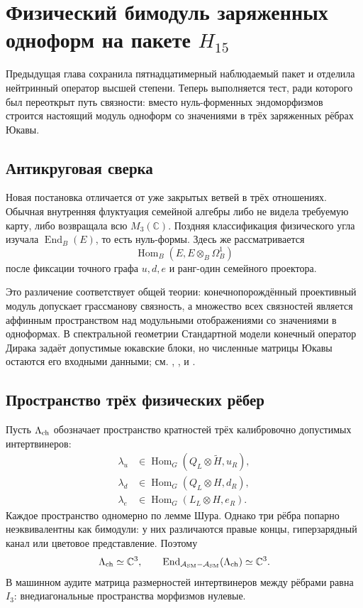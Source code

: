 \chapter{Физический бимодуль заряженных одноформ на пакете \texorpdfstring{$H_{15}$}{H15}}

Предыдущая глава сохранила пятнадцатимерный наблюдаемый пакет и отделила
нейтринный оператор высшей степени. Теперь выполняется тест, ради которого
был переоткрыт путь связности: вместо нуль-форменных эндоморфизмов строится
настоящий модуль одноформ со значениями в трёх заряженных рёбрах Юкавы.

\section{Антикруговая сверка}

Новая постановка отличается от уже закрытых ветвей в трёх отношениях.
Обычная внутренняя флуктуация семейной алгебры либо не видела требуемую
карту, либо возвращала всю $M_3(\mathbb C)$. Поздняя классификация
физического угла изучала $\operatorname{End}_B(E)$, то есть нуль-формы.
Здесь же рассматривается
\begin{equation}
 \operatorname{Hom}_B\left(E,E\otimes_B\Omega_B^1\right)
\end{equation}
после фиксации точного графа $u,d,e$ и ранг-один семейного проектора.

Это различение соответствует общей теории: конечнопорождённый проективный
модуль допускает грассманову связность, а множество всех связностей является
аффинным пространством над модульными отображениями со значениями в
одноформах. В спектральной геометрии Стандартной модели конечный оператор
Дирака задаёт допустимые юкавские блоки, но численные матрицы Юкавы остаются
его входными данными; см. ,
,  и
.

\section{Пространство трёх физических рёбер}

Пусть $\Lambda_{\rm ch}$ обозначает пространство кратностей трёх
калибровочно допустимых интертвинеров:
\begin{align}
 \lambda_u&\in\operatorname{Hom}_G(Q_L\otimes\widetilde H,u_R),\\
 \lambda_d&\in\operatorname{Hom}_G(Q_L\otimes H,d_R),\\
 \lambda_e&\in\operatorname{Hom}_G(L_L\otimes H,e_R).
\end{align}
Каждое пространство одномерно по лемме Шура. Однако три рёбра попарно
неэквивалентны как бимодули: у них различаются правые концы, гиперзарядный
канал или цветовое представление. Поэтому
\begin{equation}
 \Lambda_{\rm ch}\simeq\mathbb C^3,
 \qquad
 \operatorname{End}_{\mathcal A_{\rm SM}-\mathcal A_{\rm SM}}
 (\Lambda_{\rm ch})\simeq\mathbb C^3.
 \label{eq:v5-h15-edge-commutant}
\end{equation}
В машинном аудите матрица размерностей интертвинеров между рёбрами равна
$I_3$: внедиагональные пространства морфизмов нулевые.

